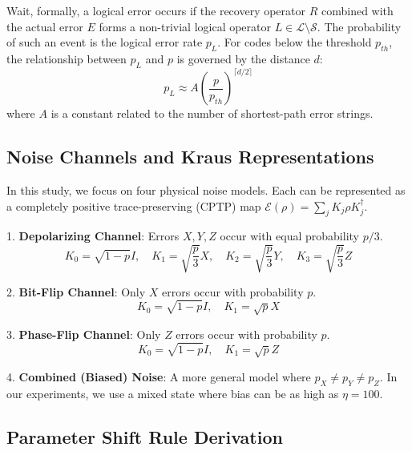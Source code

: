 \documentclass[journal,twocolumn]{IEEEtran}
\begin{document}
Wait, formally, a logical error occurs if the recovery operator $R$ combined with the actual error $E$ forms a non-trivial logical operator $L \in \mathcal{L} \setminus \mathcal{S}$. The probability of such an event is the logical error rate $p_L$. For codes below the threshold $p_{th}$, the relationship between $p_L$ and $p$ is governed by the distance $d$:
\begin{equation}
    p_L \approx A \left( \frac{p}{p_{th}} \right)^{ \lceil d/2 \rceil }
\end{equation}
where $A$ is a constant related to the number of shortest-path error strings.

\subsection{Noise Channels and Kraus Representations}

In this study, we focus on four physical noise models. Each can be represented as a completely positive trace-preserving (CPTP) map $\mathcal{E}(\rho) = \sum_j K_j \rho K_j^\dagger$.

1. \textbf{Depolarizing Channel}: Errors $X, Y, Z$ occur with equal probability $p/3$.
\begin{equation}
    K_0 = \sqrt{1-p}I, \quad K_1 = \sqrt{\frac{p}{3}}X, \quad K_2 = \sqrt{\frac{p}{3}}Y, \quad K_3 = \sqrt{\frac{p}{3}}Z
\end{equation}

2. \textbf{Bit-Flip Channel}: Only $X$ errors occur with probability $p$.
\begin{equation}
    K_0 = \sqrt{1-p}I, \quad K_1 = \sqrt{p}X
\end{equation}

3. \textbf{Phase-Flip Channel}: Only $Z$ errors occur with probability $p$.
\begin{equation}
    K_0 = \sqrt{1-p}I, \quad K_1 = \sqrt{p}Z
\end{equation}

4. \textbf{Combined (Biased) Noise}: A more general model where $p_X \neq p_Y \neq p_Z$. In our experiments, we use a mixed state where bias can be as high as $\eta = 100$.

\subsection{Parameter Shift Rule Derivation}
\end{document}
